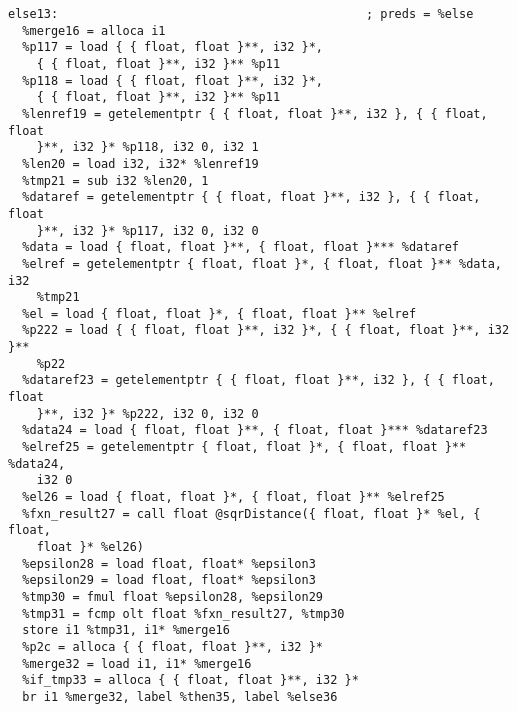 \documentclass[main.tex]{subfiles}
\begin{document}
{\begin{lstlisting}
else13:                                           ; preds = %else
  %merge16 = alloca i1
  %p117 = load { { float, float }**, i32 }*,
    { { float, float }**, i32 }** %p11
  %p118 = load { { float, float }**, i32 }*,
    { { float, float }**, i32 }** %p11
  %lenref19 = getelementptr { { float, float }**, i32 }, { { float, float
    }**, i32 }* %p118, i32 0, i32 1
  %len20 = load i32, i32* %lenref19
  %tmp21 = sub i32 %len20, 1
  %dataref = getelementptr { { float, float }**, i32 }, { { float, float 
    }**, i32 }* %p117, i32 0, i32 0
  %data = load { float, float }**, { float, float }*** %dataref
  %elref = getelementptr { float, float }*, { float, float }** %data, i32 
    %tmp21
  %el = load { float, float }*, { float, float }** %elref
  %p222 = load { { float, float }**, i32 }*, { { float, float }**, i32 }**
    %p22
  %dataref23 = getelementptr { { float, float }**, i32 }, { { float, float 
    }**, i32 }* %p222, i32 0, i32 0
  %data24 = load { float, float }**, { float, float }*** %dataref23
  %elref25 = getelementptr { float, float }*, { float, float }** %data24,
    i32 0
  %el26 = load { float, float }*, { float, float }** %elref25
  %fxn_result27 = call float @sqrDistance({ float, float }* %el, { float, 
    float }* %el26)
  %epsilon28 = load float, float* %epsilon3
  %epsilon29 = load float, float* %epsilon3
  %tmp30 = fmul float %epsilon28, %epsilon29
  %tmp31 = fcmp olt float %fxn_result27, %tmp30
  store i1 %tmp31, i1* %merge16
  %p2c = alloca { { float, float }**, i32 }*
  %merge32 = load i1, i1* %merge16
  %if_tmp33 = alloca { { float, float }**, i32 }*
  br i1 %merge32, label %then35, label %else36


\end{lstlisting}}
\end{document}
